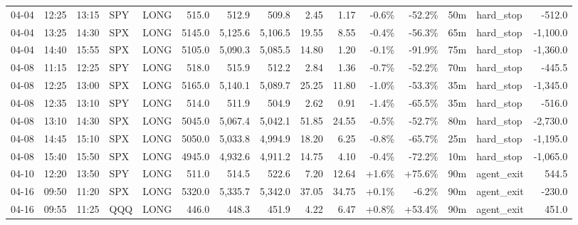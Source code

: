 \documentclass[11pt,a4paper,twoside]{article}
\begin{document}
\begin{landscape}
\begin{center}
\begin{longtable}{>{\color{txtmain}}l l l l l r r r r r r r r >{\color{txtmain}}l r}
04-04 & 12:25 & 13:15 & SPY & LONG & 515.0 & 512.9 & 509.8 & 2.45 & 1.17 & \textcolor{lossred}{-0.6\%} & \textcolor{lossred}{-52.2\%} & 50m & hard\_stop & \textcolor{lossred}{-512.0} \\
04-04 & 13:25 & 14:30 & SPX & LONG & 5145.0 & 5,125.6 & 5,106.5 & 19.55 & 8.55 & \textcolor{lossred}{-0.4\%} & \textcolor{lossred}{-56.3\%} & 65m & hard\_stop & \textcolor{lossred}{-1,100.0} \\
04-04 & 14:40 & 15:55 & SPX & LONG & 5105.0 & 5,090.3 & 5,085.5 & 14.80 & 1.20 & \textcolor{lossred}{-0.1\%} & \textcolor{lossred}{-91.9\%} & 75m & hard\_stop & \textcolor{lossred}{-1,360.0} \\
04-08 & 11:15 & 12:25 & SPY & LONG & 518.0 & 515.9 & 512.2 & 2.84 & 1.36 & \textcolor{lossred}{-0.7\%} & \textcolor{lossred}{-52.2\%} & 70m & hard\_stop & \textcolor{lossred}{-445.5} \\
04-08 & 12:25 & 13:00 & SPX & LONG & 5165.0 & 5,140.1 & 5,089.7 & 25.25 & 11.80 & \textcolor{lossred}{-1.0\%} & \textcolor{lossred}{-53.3\%} & 35m & hard\_stop & \textcolor{lossred}{-1,345.0} \\
04-08 & 12:35 & 13:10 & SPY & LONG & 514.0 & 511.9 & 504.9 & 2.62 & 0.91 & \textcolor{lossred}{-1.4\%} & \textcolor{lossred}{-65.5\%} & 35m & hard\_stop & \textcolor{lossred}{-516.0} \\
04-08 & 13:10 & 14:30 & SPX & LONG & 5045.0 & 5,067.4 & 5,042.1 & 51.85 & 24.55 & \textcolor{lossred}{-0.5\%} & \textcolor{lossred}{-52.7\%} & 80m & hard\_stop & \textcolor{lossred}{-2,730.0} \\
04-08 & 14:45 & 15:10 & SPX & LONG & 5050.0 & 5,033.8 & 4,994.9 & 18.20 & 6.25 & \textcolor{lossred}{-0.8\%} & \textcolor{lossred}{-65.7\%} & 25m & hard\_stop & \textcolor{lossred}{-1,195.0} \\
04-08 & 15:40 & 15:50 & SPX & LONG & 4945.0 & 4,932.6 & 4,911.2 & 14.75 & 4.10 & \textcolor{lossred}{-0.4\%} & \textcolor{lossred}{-72.2\%} & 10m & hard\_stop & \textcolor{lossred}{-1,065.0} \\
04-10 & 12:20 & 13:50 & SPY & LONG & 511.0 & 514.5 & 522.6 & 7.20 & 12.64 & \textcolor{wingreen}{+1.6\%} & \textcolor{wingreen}{+75.6\%} & 90m & agent\_exit & \textcolor{wingreen}{544.5} \\
04-16 & 09:50 & 11:20 & SPX & LONG & 5320.0 & 5,335.7 & 5,342.0 & 37.05 & 34.75 & \textcolor{wingreen}{+0.1\%} & \textcolor{lossred}{-6.2\%} & 90m & agent\_exit & \textcolor{lossred}{-230.0} \\
04-16 & 09:55 & 11:25 & QQQ & LONG & 446.0 & 448.3 & 451.9 & 4.22 & 6.47 & \textcolor{wingreen}{+0.8\%} & \textcolor{wingreen}{+53.4\%} & 90m & agent\_exit & \textcolor{wingreen}{451.0} \\

\end{longtable}
\end{center}
\end{landscape}
\end{document}

